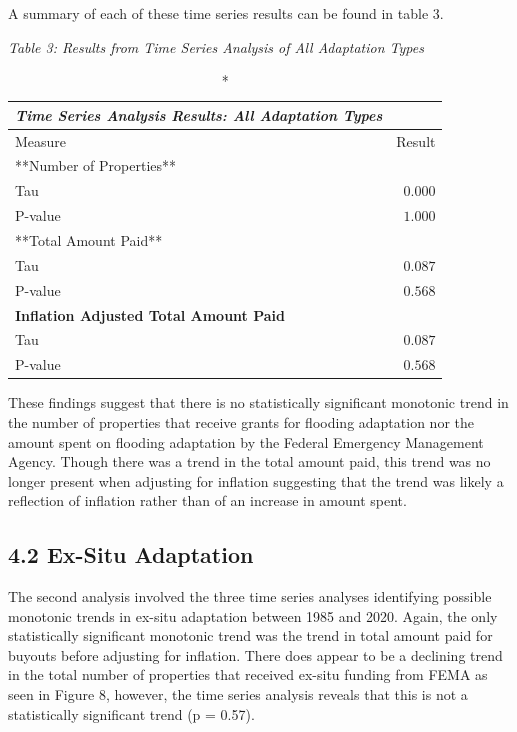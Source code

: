 \documentclass[
  12pt,
]{article}
\begin{document}
A summary of each of these time series results can be found in table 3.

\emph{Table 3: Results from Time Series Analysis of All Adaptation
Types}\\
\captionsetup[table]{labelformat=empty,skip=1pt}

\begin{longtable}{lr}
\caption*{
{\large \emph{\textbf{Time Series Analysis Results: All Adaptation Types}}}
} \\ 
\toprule
Measure & Result \\ 
\midrule
\multicolumn{1}{l}{**Number of Properties**} \\ 
\midrule
Tau & $0.000$ \\ 
P-value & $1.000$ \\ 
\midrule
\multicolumn{1}{l}{**Total Amount Paid**} \\ 
\midrule
Tau & $0.087$ \\ 
P-value & $0.568$ \\ 
\midrule
\multicolumn{1}{l}{\textbf{Inflation Adjusted Total Amount Paid}} \\ 
\midrule
Tau & $0.087$ \\ 
P-value & $0.568$ \\ 
\bottomrule
\end{longtable}

These findings suggest that there is no statistically significant
monotonic trend in the number of properties that receive grants for
flooding adaptation nor the amount spent on flooding adaptation by the
Federal Emergency Management Agency. Though there was a trend in the
total amount paid, this trend was no longer present when adjusting for
inflation suggesting that the trend was likely a reflection of inflation
rather than of an increase in amount spent.

\hypertarget{ex-situ-adaptation}{%
\subsection{4.2 Ex-Situ Adaptation}\label{ex-situ-adaptation}}

The second analysis involved the three time series analyses identifying
possible monotonic trends in ex-situ adaptation between 1985 and 2020.
Again, the only statistically significant monotonic trend was the trend
in total amount paid for buyouts before adjusting for inflation. There
does appear to be a declining trend in the total number of properties
that received ex-situ funding from FEMA as seen in Figure 8, however,
the time series analysis reveals that this is not a statistically
significant trend (p = 0.57).
\end{document}
